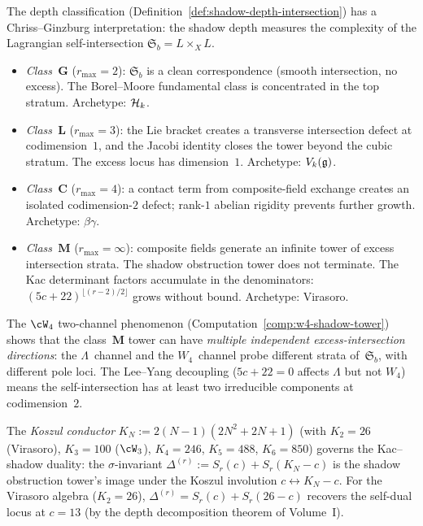 \begin{remark}%
\label{rem:cg-atlas}%
%
%
The depth classification
(Definition~\ref{def:shadow-depth-intersection}) has a
Chriss--Ginzburg interpretation: the shadow depth measures
the complexity of the Lagrangian self-intersection
$\mathfrak{S}_b = L\times_X L$.
\begin{itemize}[nosep]
\item \emph{Class~$\mathbf{G}$} ($r_{\max}=2$): $\mathfrak{S}_b$ is
 a clean correspondence (smooth intersection, no excess).
 The Borel--Moore fundamental class is concentrated in the
 top stratum. Archetype: $\mathcal{H}_k$.
\item \emph{Class~$\mathbf{L}$} ($r_{\max}=3$): the Lie bracket
 creates a transverse intersection defect at codimension~$1$,
 and the Jacobi identity closes the tower beyond the cubic
 stratum. The excess locus has dimension~$1$. Archetype: $V_k(\mathfrak{g})$.
\item \emph{Class~$\mathbf{C}$} ($r_{\max}=4$): a contact term
 from composite-field exchange creates an isolated
 codimension-$2$ defect; rank-$1$ abelian rigidity
 prevents further growth. Archetype: $\beta\gamma$.
\item \emph{Class~$\mathbf{M}$} ($r_{\max}=\infty$): composite
 fields generate an infinite tower of excess intersection
 strata. The shadow obstruction tower does not terminate. The Kac
 determinant factors accumulate in the denominators:
 $(5c+22)^{\lfloor(r-2)/2\rfloor}$ grows without bound.
 Archetype: Virasoro.
\end{itemize}
The $\cW_4$ two-channel phenomenon
(Computation~\ref{comp:w4-shadow-tower}) shows that the
class~$\mathbf{M}$ tower can have \emph{multiple independent
excess-intersection directions}: the $\Lambda$~channel and the
$W_4$~channel probe different strata of~$\mathfrak{S}_b$, with
different pole loci. The Lee--Yang decoupling
($5c+22 = 0$ affects $\Lambda$ but not $W_4$) means the
self-intersection has at least two irreducible components
at codimension~$2$.
\end{remark}

\begin{remark}%
\label{rem:koszul-conductor}%
%
%
The \emph{Koszul conductor}
$K_N := 2(N{-}1)(2N^2+2N+1)$ (with $K_2 = 26$ (Virasoro),
$K_3 = 100$ ($\cW_3$), $K_4 = 246$, $K_5 = 488$,
$K_6 = 850$) governs the Kac--shadow duality: the
$\sigma$-invariant
$\Delta^{(r)} := S_r(c) + S_r(K_N - c)$
is the shadow obstruction tower's image under the Koszul involution
$c \leftrightarrow K_N - c$.
For the Virasoro algebra ($K_2 = 26$),
$\Delta^{(r)} = S_r(c) + S_r(26 - c)$ recovers the
self-dual locus at $c = 13$
(by the depth decomposition theorem of Volume~I).
\end{remark}

